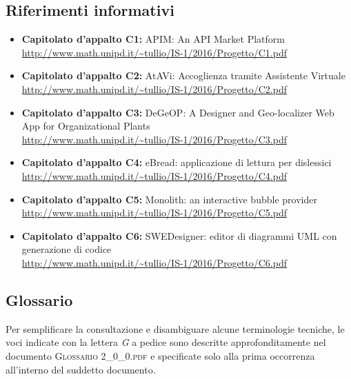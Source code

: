 \subsection{Riferimenti informativi}
\begin{itemize}
	\item \textbf{Capitolato d'appalto C1:} APIM: An API Market Platform \\ \url{http://www.math.unipd.it/~tullio/IS-1/2016/Progetto/C1.pdf}
	\item \textbf{Capitolato d'appalto C2:} AtAVi: Accoglienza tramite Assistente Virtuale \\ \url{http://www.math.unipd.it/~tullio/IS-1/2016/Progetto/C2.pdf}
	\item \textbf{Capitolato d'appalto C3:} DeGeOP: A Designer and Geo-localizer Web App for Organizational Plants \\
	\url{http://www.math.unipd.it/~tullio/IS-1/2016/Progetto/C3.pdf}
	\item \textbf{Capitolato d'appalto C4:} eBread: applicazione di lettura per dislessici \\
	\url{http://www.math.unipd.it/~tullio/IS-1/2016/Progetto/C4.pdf}
	\item \textbf{Capitolato d'appalto C5:} Monolith: an interactive bubble provider \\
	\url{http://www.math.unipd.it/~tullio/IS-1/2016/Progetto/C5.pdf}
	\item \textbf{Capitolato d'appalto C6:} SWEDesigner: editor di diagrammi UML con generazione di codice \\
	\url{http://www.math.unipd.it/~tullio/IS-1/2016/Progetto/C6.pdf}
\end{itemize}

\subsection{Glossario}
Per semplificare la consultazione e disambiguare alcune terminologie tecniche, le voci indicate con la lettera \textit{G} a pedice sono descritte approfonditamente nel documento \textsc{Glossario 2\_0\_0.pdf} e specificate solo alla prima occorrenza all'interno del suddetto documento.